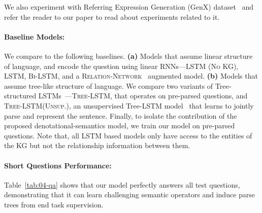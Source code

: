 \documentclass[main.tex]{subfiles}
\begin{document}

We also experiment with Referring Expression Generation (GenX) dataset~\cite{refexp-fitzgerald-2013} and refer the reader to our paper to read about experiments related to it.



\paragraph{Baseline Models:}
We compare to the following baselines.
\textbf{(a)} Models that assume linear structure of language, and encode the question using linear RNNs---\textsc{LSTM (No KG)}, \textsc{LSTM}, \textsc{Bi-LSTM}, and a \textsc{Relation-Network}~\cite{relnet-santoro-2017} augmented model.
\textbf{(b)} Models that assume tree-like structure of language. We compare two variants of Tree-structured LSTMs~\cite{recursivelstm-zhu-2015,treelstm-tai-2015}---\textsc{Tree-LSTM}, that operates on pre-parsed questions, and \textsc{Tree-LSTM(Unsup.)}, an unsupervised Tree-LSTM model~\cite{malliard-unsuptree-2017} that learns to jointly parse and represent the sentence.
Finally, to isolate the contribution of the proposed denotational-semantics model, we train our model on pre-parsed questions.
Note that, all LSTM based models only have access to the entities of the KG but not the relationship information between them.


\paragraph{Short Questions Performance:}
Table~\ref{tab:04-qa} shows that our model perfectly answers all test questions, demonstrating that it can learn challenging semantic operators and induce parse trees from end task supervision.
\end{document}
